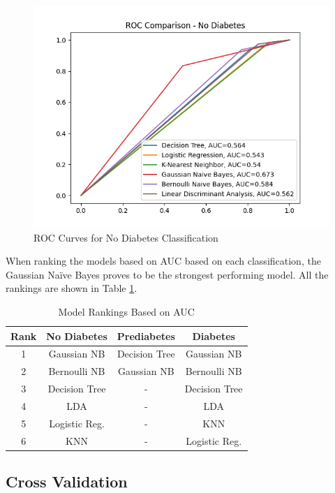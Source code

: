 \documentclass[journal]{IEEEtran}
\begin{document}
\begin{figure}[h!]
    \centering
    \includegraphics[scale=0.5]{ROC Comparison - No Diabetes.png}
    \caption{ROC Curves for No Diabetes Classification}
    \label{fig:nodiabetes}
\end{figure}

\newpage

When ranking the models based on AUC based on each classification, the Gaussian Naïve Bayes proves to be the strongest performing model. All the rankings are shown in Table \ref{table:auc-rankings}.

\begin{table}[h!]
\centering
\begin{tabular}{c | c c c}
Rank & No Diabetes & Prediabetes & Diabetes \\
\hline
1 & Gaussian NB & Decision Tree & Gaussian NB \\
2 & Bernoulli NB & Gaussian NB & Bernoulli NB\\
3 & Decision Tree & - & Decision Tree\\
4 & LDA & - & LDA\\
5 & Logistic Reg. & - & KNN\\
6 & KNN & - & Logistic Reg.\\
\end{tabular}
\caption{Model Rankings Based on AUC}
\label{table:auc-rankings}
\end{table}

\subsection{Cross Validation}
\end{document}
